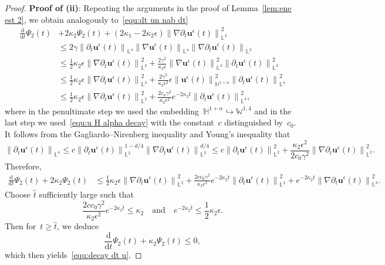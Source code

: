 \documentclass[11pt,reqno]{amsart}
\theoremstyle{definition}
\numberwithin{equation}{section}
\newcommand{\bff}{\boldsymbol}
\newcommand{\bb}{\mathbb}
\newcommand{\ddt}{\frac{\mathrm{d}}{\mathrm{d}t}}
\newcommand{\pa}{\partial}
\newcommand{\nn}{\nonumber}
\newcommand{\norm}[2]{\left\|{#1}\right\|_{#2}}
\begin{document}
\begin{proof}
	\medskip
	\noindent
	\textbf{Proof of (ii)}: Repeating the arguments in the proof of 
	Lemma~\ref{lem:ene est 2}, we obtain analogously to~\eqref{equ:dt un nab dt}
	\begin{align*}%
		\ddt \Psi_2(t)
		&+
		2 \kappa_2 \Psi_2(t)
		+ 
		(2\kappa_1-2\kappa_2 \epsilon) 
		\norm{\nabla \pa_t\bff{u}^\epsilon(t)}{\bb{L}^2}^2
		\nn \\
		&\leq
		2\gamma
		\norm{\partial_t \bff{u}^\epsilon(t)}{\bb{L}^4} 
		\norm{\nabla \bff{u}^\epsilon(t)}{\bb{L}^4} 
		\norm{\nabla \partial_t \bff{u}^\epsilon(t)}{\bb{L}^2}
		\nn \\
		&\leq
		\frac12 \kappa_2 \epsilon 
		\norm{\nabla \partial_t \bff{u}^\epsilon(t)}{\bb{L}^2}^2
		+
		\frac{2\gamma^2}{\kappa_2 \epsilon} 
		\norm{\nabla \bff{u}^\epsilon (t)}{\bb{L}^4}^2 
		\norm{\partial_t \bff{u}^\epsilon(t)}{\bb{L}^4}^2
		\nn \\
		&\leq
		\frac12 \kappa_2 \epsilon 
		\norm{\nabla \partial_t \bff{u}^\epsilon(t)}{\bb{L}^2}^2
		+
		\frac{2\gamma^2}{\kappa_2 \epsilon^2} 
		\epsilon
		\norm{\bff{u}^\epsilon(t)}{\bb{H}^{1+\alpha}}^2 
		\norm{\partial_t \bff{u}^\epsilon(t)}{\bb{L}^4}^2
		\nn \\
		&\leq
		\frac12 \kappa_2 \epsilon 
		\norm{\nabla \partial_t \bff{u}^\epsilon(t)}{\bb{L}^2}^2
		+
		\frac{2c_0 \gamma^2}{\kappa_2 \epsilon^2} e^{-2\kappa_2 t} 
		\norm{\partial_t \bff{u}^\epsilon(t)}{\bb{L}^4}^2,
	\end{align*}
	where in the penultimate step we used the
	embedding~$\bb{H}^{1+\alpha} \hookrightarrow \bb{W}^{1,4}$ and in the last step we
	used~\eqref{equ:u H alpha decay} with the constant~$c$ distinguished by~$c_0$.
	It follows from the Gagliardo--Nirenberg inequality and Young's
	inequality that
	\[
		\norm{\partial_t \bff{u}^\epsilon(t)}{\bb{L}^4}
		\le
		c
		\norm{\partial_t \bff{u}^\epsilon(t)}{\bb{L}^2}^{1-d/4}
		\norm{\nabla \partial_t \bff{u}^\epsilon(t)}{\bb{L}^2}^{d/4} 
		\le
		c\norm{\partial_t \bff{u}^\epsilon(t)}{\bb{L}^2}^2 
		+ 
		\frac{\kappa_2 \epsilon^2}{2c_0 \gamma^2} 
		\norm{\nabla \partial_t \bff{u}^\epsilon(t)}{\bb{L}^2}^2.
	\]
	Therefore,
	\begin{align*} 
		\ddt \Psi_2(t)
		+
		2 \kappa_2 \Psi_2(t)
		&\le
		\frac12 \kappa_2 \epsilon 
		\norm{\nabla \partial_t \bff{u}^\epsilon(t)}{\bb{L}^2}^2
		+
		\frac{2cc_0 \gamma^2}{\kappa_2 \epsilon^2} 
		e^{-2\kappa_2 t} 
		\norm{\partial_t \bff{u}^\epsilon(t)}{\bb{L}^2}^2
		+
		e^{-2\kappa_2 t} 
		\norm{\nabla \partial_t \bff{u}^\epsilon(t)}{\bb{L}^2}^2.
	\end{align*}
	Choose $\hat t$ sufficiently large such that
	\[
	\frac{2c c_0 \gamma^2}{\kappa_2 \epsilon^2} e^{-2\kappa_2 \hat t} 
	\leq 
	\kappa_2
	\quad\text{and}\quad 
	e^{-2\kappa_2 \hat t} 
	\leq 
	\frac12 
	\kappa_2 \epsilon.
	\]
	Then for~$t\ge\hat t$, we deduce
	\[
		\ddt \Psi_2(t)
		+ 
		\kappa_2 \Psi_2(t)
		\le 0,	
	\]
	which then yields~\eqref{equ:decay dt u}.


\end{proof}
\end{document}
